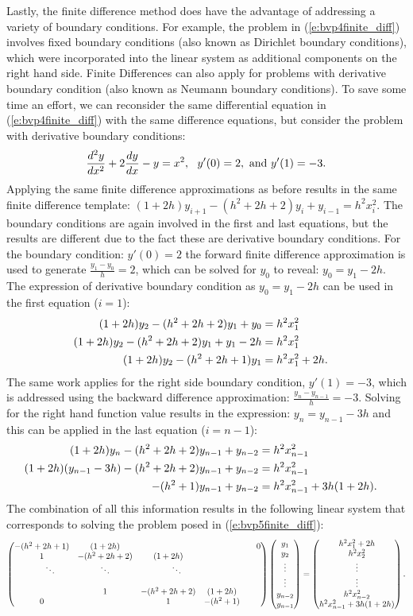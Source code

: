 \documentclass[twoside]{article}
\def\ds{\displaystyle}
\begin{document}
Lastly, the finite difference method does have the advantage of addressing a variety of boundary conditions. For example, the problem in (\ref{e:bvp4finite_diff}) involves fixed boundary conditions (also known as Dirichlet boundary conditions), which were incorporated into the linear system as additional components on the right hand side. Finite Differences can also apply for problems with derivative boundary condition (also known as Neumann boundary conditions). To save some time an effort, we can reconsider the same differential equation in (\ref{e:bvp4finite_diff}) with the same difference equations, but consider the problem with derivative boundary conditions:
\begin{equation}
    \frac {d^2y}{dx^2} + 2 \frac {dy}{dx} - y = x^2, \ \ y'(0)=2, \ {\rm and} \ y'(1)= -3.
    \label{e:bvp5finite_diff}
\end{equation}
Applying the same finite difference approximations as before results in the same finite difference template:  $\ds (1+2h)y_{i+1} - (h^2+2h+2)y_i + y_{i-1} = h^2x_i^2$. The boundary conditions are again involved in the first and last equations, but the results are different due to the fact these are derivative boundary conditions. For the boundary condition: $\ds y'(0)=2$ the forward finite difference approximation is used to generate $\ds \frac {y_1-y_0}h = 2$, which can be solved for $\ds y_0$ to reveal: $\ds y_0 = y_1-2h$. The expression of derivative boundary condition as  $\ds y_0 = y_1-2h$ can be used in the first equation ($i=1$):
\begin{align*}
    (1+2h)y_{2} - (h^2+2h+2)y_1 + y_{0} &= h^2x_1^2 \cr 
    (1+2h)y_{2} - (h^2+2h+2)y_1 + y_1-2h &= h^2x_1^2 \cr
    (1+2h)y_{2} - (h^2+2h+1)y_1  &= h^2x_1^2+2h.
\end{align*}
The same work applies for the right side boundary condition, $\ds y'(1)= -3$, which is addressed using the backward difference approximation: $\ds \frac {y_n-y_{n-1}}h = -3$. Solving for the right hand function value results in the expression: $\ds  y_n = y_{n-1} -3h$ and this can be applied in the last equation ($\ds i=n-1$):
\begin{align*}
(1+2h)y_{n} - (h^2+2h+2)y_{n-1} + y_{n-2} &= h^2x_{n-1}^2 \cr
(1+2h)(y_{n-1} -3h) - (h^2+2h+2)y_{n-1} + y_{n-2} &= h^2x_{n-1}^2 \cr
- (h^2+1)y_{n-1} + y_{n-2} &= h^2x_{n-1}^2 + 3h(1+2h).
\end{align*}
The combination of all this information results in the following linear system that corresponds to solving the problem posed in (\ref{e:bvp5finite_diff}):
$$ \begin{pmatrix} -(h^2+2h+1) & (1+2h) &  & & & 0 \cr 1 & -(h^2+2h+2) & (1+2h) & & & \cr  \ \ \ \ \ \  \ddots & \ddots & \ \ \ \ \ \ \ddots &  & \cr  \cr & 1 & -(h^2+2h+2) &  (1+2h) \cr 0 &  & 1 & -(h^2+1) \end{pmatrix} \begin{pmatrix} y_1 \cr y_2 \cr \vdots \cr \vdots \cr y_{n-2} \cr y_{n-1}\end{pmatrix} = \begin{pmatrix} h^2 x_1^2 + 2h \cr h^2x_2^2 \cr \vdots \cr \vdots \cr h^2 x_{n-2}^2 \cr h^2x_{n-1}^2+3h(1+2h)\end{pmatrix}.$$
\end{document}

